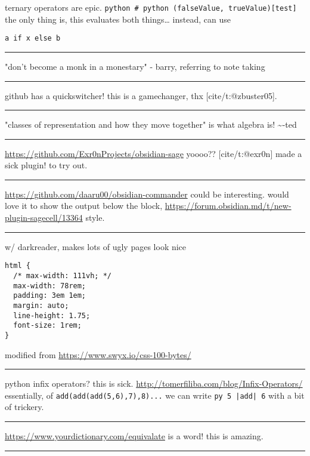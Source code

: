 \documentclass[letterpaper]{article}
\begin{document}
ternary operators are epic.
\texttt{python \# python (falseValue, trueValue)[test]} the only thing is, this
evaluates both things\ldots{} instead, can use

\begin{verbatim}
a if x else b
\end{verbatim}

\noindent\rule{\textwidth}{0.5pt}

"don't become a monk in a monestary" - barry, referring to note taking

\noindent\rule{\textwidth}{0.5pt}

github has a quickswitcher! this is a gamechanger, thx
[cite/t:@zbuster05].

\noindent\rule{\textwidth}{0.5pt}

"classes of representation and how they move together" is what algebra
is! \textasciitilde{}-ted

\noindent\rule{\textwidth}{0.5pt}

\url{https://github.com/Exr0nProjects/obsidian-sage} yoooo?? [cite/t:@exr0n]
made a sick plugin! to try out.

\noindent\rule{\textwidth}{0.5pt}

\url{https://github.com/daaru00/obsidian-commander} could be interesting.
would love it to show the output below the block,
\url{https://forum.obsidian.md/t/new-plugin-sagecell/13364} style.

\noindent\rule{\textwidth}{0.5pt}

w/ darkreader, makes lots of ugly pages look nice

\begin{verbatim}
html {
  /* max-width: 111vh; */
  max-width: 78rem;
  padding: 3em 1em;
  margin: auto;
  line-height: 1.75;
  font-size: 1rem;
}
\end{verbatim}

modified from \url{https://www.swyx.io/css-100-bytes/}

\noindent\rule{\textwidth}{0.5pt}

python infix operators? this is sick.
\url{http://tomerfiliba.com/blog/Infix-Operators/} essentially, of
\texttt{add(add(add(5,6),7),8)...} we can write \texttt{py 5 |add| 6} with a bit of
trickery.

\noindent\rule{\textwidth}{0.5pt}

\url{https://www.yourdictionary.com/equivalate} is a word! this is amazing.

\noindent\rule{\textwidth}{0.5pt}
\end{document}
